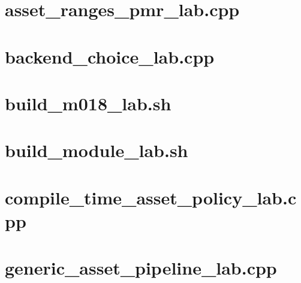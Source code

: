 \documentclass[11pt,twoside,openany]{book}
\begin{document}
\section*{asset\_ranges\_pmr\_lab.cpp}
\hypertarget{source-file-9e5ff4ba88e6efabc938832a}{}
\label{attachmentstart:source-file-9e5ff4ba88e6efabc938832a}
\section*{backend\_choice\_lab.cpp}
\hypertarget{source-file-c936569afa19be638ec87991}{}
\label{attachmentstart:source-file-c936569afa19be638ec87991}
\section*{build\_m018\_lab.sh}
\hypertarget{source-file-e1b7c3e4f52da0e7c9c36a41}{}
\label{attachmentstart:source-file-e1b7c3e4f52da0e7c9c36a41}
\section*{build\_module\_lab.sh}
\hypertarget{source-file-f5eb017280bb6b2ae6b1475d}{}
\label{attachmentstart:source-file-f5eb017280bb6b2ae6b1475d}
\section*{compile\_time\_asset\_policy\_lab.cpp}
\hypertarget{source-file-a5db53514d74ae247b4ac42f}{}
\label{attachmentstart:source-file-a5db53514d74ae247b4ac42f}
\section*{generic\_asset\_pipeline\_lab.cpp}
\hypertarget{source-file-8aedc3fdcd10c91971507448}{}
\label{attachmentstart:source-file-8aedc3fdcd10c91971507448}
\end{document}
